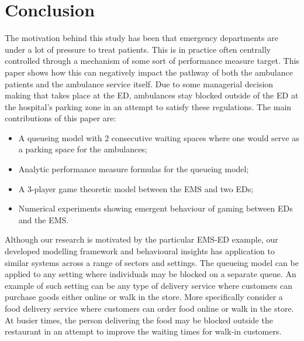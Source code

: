 \section{Conclusion}

The motivation behind this study has been that emergency departments are
under a lot of pressure to treat patients.
This is in practice often centrally controlled through a mechanism of some sort
of performance measure target.
This paper shows how this can negatively impact the pathway of both the
ambulance patients and the ambulance service itself.
Due to some managerial decision making that takes place at the ED, ambulances
stay blocked outside of the ED at the hospital's parking zone in an attempt
to satisfy these regulations.
The main contributions of this paper are:
\begin{itemize}
    \item A queueing model with 2 consecutive waiting spaces where one would
    serve as a parking space for the ambulances;
    \item Analytic performance measure formulas for the queueing model;
    \item A 3-player game theoretic model between the EMS and two EDs;
    \item Numerical experiments showing emergent behaviour of gaming between
    EDs and the EMS.
\end{itemize}
Although our research is motivated by the particular EMS-ED example, our 
developed modelling framework and behavioural insights has application to 
similar systems across a range of sectors and settings.
The queueing model can be applied to any setting where individuals may be
blocked on a separate queue.
An example of such setting can be any type of delivery service where customers
can purchase goods either online or walk in the store.
More specifically consider a food delivery service where customers can order
food online or walk in the store.
At busier times, the person delivering the food may be blocked outside the
restaurant in an attempt to improve the waiting times for walk-in customers.

